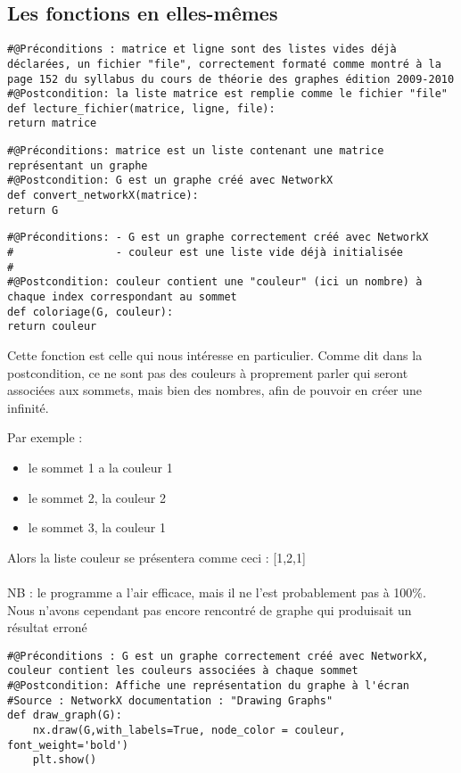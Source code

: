 \documentclass[a4paper, 11pt, oneside]{article}
\begin{document}
\subsection{Les fonctions en elles-mêmes}
\begin{lstlisting}[caption={lecture du fichier}]
#@Préconditions : matrice et ligne sont des listes vides déjà déclarées, un fichier "file", correctement formaté comme montré à la page 152 du syllabus du cours de théorie des graphes édition 2009-2010
#@Postcondition: la liste matrice est remplie comme le fichier "file"
def lecture_fichier(matrice, ligne, file):
return matrice
\end{lstlisting}

\begin{lstlisting}[caption={Convertir la matrice en graphe}]
#@Préconditions: matrice est un liste contenant une matrice représentant un graphe
#@Postcondition: G est un graphe créé avec NetworkX
def convert_networkX(matrice):
return G
\end{lstlisting}
\newpage




\begin{lstlisting}[caption={Coloriage des sommets}]
#@Préconditions: - G est un graphe correctement créé avec NetworkX
#                - couleur est une liste vide déjà initialisée
#
#@Postcondition: couleur contient une "couleur" (ici un nombre) à chaque index correspondant au sommet
def coloriage(G, couleur):
return couleur
\end{lstlisting}
Cette fonction est celle qui nous intéresse en particulier.
Comme dit dans la postcondition, ce ne sont pas des couleurs à proprement parler qui seront associées aux sommets, mais bien des nombres, afin de pouvoir en créer une infinité.

Par exemple : \begin{itemize}
              \item le sommet 1 a la couleur 1
              \item le sommet 2, la couleur 2
              \item le sommet 3, la couleur 1
              \end{itemize}
Alors la liste couleur se présentera comme ceci : [1,2,1]
\\
\\
NB : le programme a l'air efficace, mais il ne l'est probablement pas à 100\%. Nous n'avons cependant pas encore rencontré de graphe qui produisait un résultat erroné
\begin{lstlisting}[caption={Afficher le graphe à l'écran}]
#@Préconditions : G est un graphe correctement créé avec NetworkX, couleur contient les couleurs associées à chaque sommet
#@Postcondition: Affiche une représentation du graphe à l'écran
#Source : NetworkX documentation : "Drawing Graphs"
def draw_graph(G):
    nx.draw(G,with_labels=True, node_color = couleur, font_weight='bold')
    plt.show()
\end{lstlisting}
\end{document}
